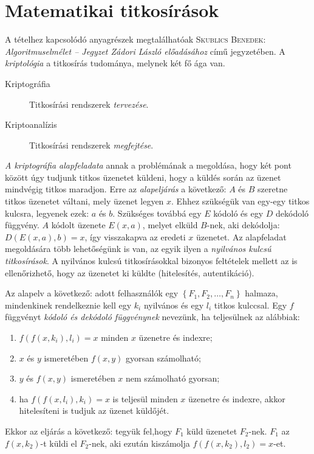 \documentclass[DIV=15,appendixprefix]{scrreprt}
\theoremstyle{definition}
\theoremstyle{remark}
\begin{document}
\section{Matematikai titkosírások}
A tételhez kapcsolódó anyagrészek megtalálhatóak \textsc{Skublics Benedek}: \emph{Algoritmuselmélet -- Jegyzet Zádori László előadásához} \cite{Zadori} című jegyzetében.
%
A \emph{kriptológia} a titkosírás tudománya, melynek két fő ága van.
\begin{description}
	\item[Kriptográfia] Titkosírási rendszerek \emph{tervezése}.
	\item[Kriptoanalízis] Titkosírási rendszerek \emph{megfejtése}.
\end{description}
\emph{A kriptográfia alapfeladata} annak a problémának a megoldása, hogy két pont között úgy tudjunk
titkos üzenetet küldeni, hogy a küldés során az üzenet mindvégig titkos maradjon. Erre az
\emph{alapeljárás} a következő: $ A $ és $ B $ szeretne titkos üzenetet váltani, mely üzenet legyen
$ x $. Ehhez szükségük van egy-egy titkos kulcsra, legyenek ezek: $ a $ és $ b $. Szükséges továbbá
egy $ E $ kódoló és egy $ D $ dekódoló függvény. $ A $ kódolt üzenete $ E \left( x,{} a \right) $,
melyet elküld $ B $-nek, aki dekódolja: $ D \left(  E \left( x,{} a \right),{} b \right) = x $, így
visszakapva az eredeti $ x $ üzenetet.
%
Az alapfeladat megoldására több lehetőségünk is van, az egyik ilyen a \emph{nyilvános kulcsú
titkosírások}. A nyilvános kulcsú titkosírásokkal bizonyos feltételek mellett az is ellenőrizhető,
hogy az üzenetet ki küldte (hitelesítés, autentikáció).

Az alapelv a következő: adott felhasználók egy $ \left\{ F_{ 1 },{} F_{ 2 },{} \ldots,{} F_{ n }
\right\} $ halmaza, mindenkinek rendelkeznie kell egy $ k_{ i } $ nyilvános és egy $ l_{ i } $
titkos kulccsal. Egy $ f $ függvényt \emph{kódoló és dekódoló függvénynek} nevezünk, ha teljesülnek
az alábbiak:
	\begin{enumerate}
		\item $ f \left( f \left( x,{} k_{ i } \right), {} l_{ i } \right) = x $ minden $ x $
			üzenetre és indexre;
		\item $ x $ és $ y $ ismeretében $ f \left( x,{} y \right) $ gyorsan számolható;
		\item $ y $ és $ f \left( x,{} y \right) $ ismeretében $ x $ nem számolható gyorsan;
		\item\label{itm:felt} ha $ f \left( f \left( x,{} l_{ i } \right), {} k_{ i } \right) = x $
			is teljesül minden $x$ üzenetre és indexre, akkor hitelesíteni is tudjuk az üzenet
			küldőjét.
	\end{enumerate}
Ekkor az eljárás a következő: tegyük fel,hogy $ F_{ 1 } $ küld üzenetet $ F_{ 2 }$-nek. $ F_{ 1 } $
az $ f \left( x,{} k_{ 2 } \right) $-t küldi el $F_{ 2 } $-nek, aki ezután kiszámolja $ f \left( f
\left( x,{} k_{ 2 } \right), {} l_{ 2 } \right)=x $-et.
\end{document}
